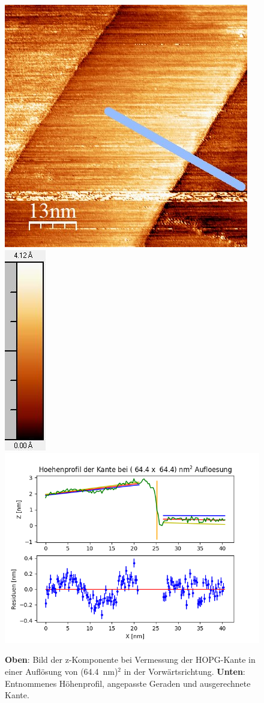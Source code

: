 \documentclass[12pt,a4paper]{article}
\begin{document}
\begin{figure}[H]
\centering
\includegraphics[scale=0.6]{Bilder/Anhang/Kante/0644_Kante_vor.jpg}
\includegraphics[scale=0.7]{Bilder/Anhang/Kante/0644_Kante_vor_Skala.jpg}
\includegraphics[scale=0.55]{Bilder/Anhang/Kante/Profil_Kante_0644_vor.png}
\caption{\textbf{Oben}: Bild der z-Komponente bei Vermessung der HOPG-Kante in einer Auflösung von (\SI{64,4}{nm})$^2$ in der Vorwärtsrichtung. \textbf{Unten}: Entnommenes Höhenprofil, angepasste Geraden und ausgerechnete Kante.}
\end{figure}
\end{document}
